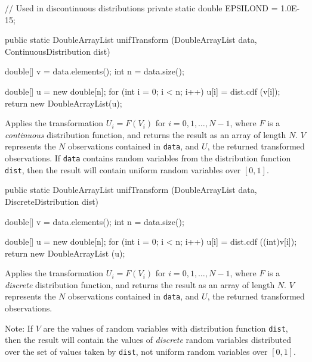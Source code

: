 \begin{code}\begin{hide}
   // Used in discontinuous distributions
   private static double EPSILOND = 1.0E-15;
\end{hide}

   public static DoubleArrayList unifTransform (DoubleArrayList data,
                                         ContinuousDistribution dist)\begin{hide} {
      double[] v = data.elements();
      int n = data.size();

      double[] u = new double[n];
      for (int i = 0; i < n; i++)
         u[i] = dist.cdf (v[i]);
      return new DoubleArrayList(u);
   }\end{hide}
\end{code}
\begin{tabb} Applies the transformation $U_i = F (V_i)$ for $i = 0, 1, \ldots, N-1$,
  where $F$ is a {\em continuous\/} distribution function,
  and returns the result as an array of length $N$.
  $V$ represents the $N$ observations contained in \texttt{data},
  and $U$, the returned transformed observations.
  If \texttt{data} contains random variables from the distribution function
  \texttt{dist}, then the result will contain uniform random variables
  over $[0,1]$.
\end{tabb}
\begin{htmlonly}
\end{htmlonly}
\begin{code}

   public static DoubleArrayList unifTransform (DoubleArrayList data,
                                        DiscreteDistribution dist)\begin{hide} {
       double[] v = data.elements();
       int n = data.size();

       double[] u = new double[n];
       for (int i = 0; i < n; i++)
          u[i] = dist.cdf ((int)v[i]);
       return new DoubleArrayList (u);
   }\end{hide}
\end{code}
\begin{tabb} Applies the transformation $U_i = F (V_i)$ for $i = 0, 1, \ldots, N-1$,
   where $F$ is a {\em discrete\/} distribution function,
   and returns the result as an array of length $N$.
  $V$ represents the $N$ observations contained in \texttt{data},
  and $U$, the returned transformed observations.

   Note: If $V$ are the values of random variables with
   distribution function \texttt{dist}, then the result will contain
   the values of {\em discrete\/} random variables distributed over the
   set of values taken by \texttt{dist},
   not uniform random variables over $[0,1]$.
\end{tabb}
